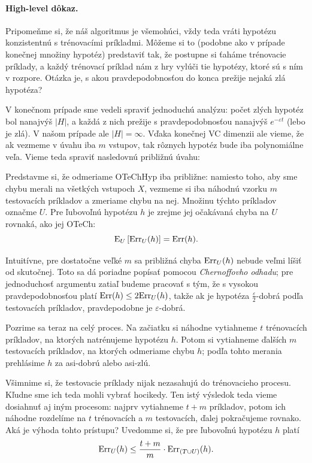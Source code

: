 \paragraph{High-level dôkaz.} Pripomeňme si, že náš algoritmus je všemohúci,
vždy teda vráti hypotézu konzistentnú s trénovacími príkladmi. Môžeme si
to (podobne ako v prípade konečnej množiny hypotéz) predstaviť tak, že
postupne si ťaháme trénovacie príklady, a každý trénovací príklad nám
z hry vylúči tie hypotézy, ktoré sú s ním v rozpore. Otázka je, s akou
pravdepodobnosťou do konca prežije nejaká zlá hypotéza?

V konečnom prípade sme vedeli spraviť jednoduchú analýzu: počet zlých
hypotéz bol nanajvýš $|H|$, a každá z nich prežije s pravdepodobnosťou
nanajvýš $e^{-\varepsilon t}$ (lebo je zlá). V našom prípade ale
$|H| = \infty$. Vďaka konečnej VC dimenzii ale vieme, že ak vezmeme
v úvahu iba $m$ vstupov, tak rôznych hypotéz bude iba polynomiálne
veľa. Vieme teda spraviť nasledovnú približnú úvahu:

Predstavme si, že odmeriame OTeChHyp iba približne: namiesto toho, aby sme
chybu merali na všetkých vstupoch $X$, vezmeme si iba náhodnú vzorku $m$
testovacích príkladov a zmeriame chybu na nej. Množinu týchto príkladov
označme $U$. Pre ľubovoľnú hypotézu $h$ je zrejme jej očakávaná chyba na $U$
rovnaká, ako jej OTeCh:
$$ \mathrm{E}_U \left[ \mathrm{Err}_U(h) \right] = \mathrm{Err}(h). $$

Intuitívne, pre dostatočne veľké $m$ sa približná chyba $\mathrm{Err}_U(h)$ nebude
veľmi líšiť od skutočnej. Toto sa dá poriadne popísať pomocou \emph{Chernoffovho odhadu};
pre jednoduchosť argumentu zatiaľ budeme pracovať s tým, že s vysokou pravdepodobnosťou
platí $\mathrm{Err}(h) \leq 2 \mathrm{Err}_U(h)$, takže ak je hypotéza $\frac{\varepsilon}{2}$-dobrá
podľa testovacích príkladov, pravdepodobne je $\varepsilon$-dobrá.

Pozrime sa teraz na celý proces. Na začiatku si náhodne
vytiahneme $t$ trénovacích príkladov, na ktorých natrénujeme hypotézu $h$.
Potom si vytiahneme ďalších $m$ testovacích príkladov, na ktorých odmeriame
chybu $h$; podľa tohto merania prehlásime $h$ za asi-dobrú alebo asi-zlú.

Všimnime si, že testovacie príklady nijak nezasahujú do trénovacieho
procesu. Kľudne sme ich teda mohli vybrať hocikedy. Ten istý výsledok
teda vieme dosiahnuť aj iným procesom: najprv vytiahneme $t + m$ príkladov,
potom ich náhodne rozdelíme na $t$ trénovacích a $m$ testovacích, ďalej
pokračujeme rovnako. Aká je výhoda tohto prístupu? Uvedomme si, že pre
ľubovoľnú hypotézu $h$ platí
$$ \mathrm{Err}_U(h) \leq \frac{t + m}{m} \cdot \mathrm{Err}_{(T \cup U)}(h). $$

